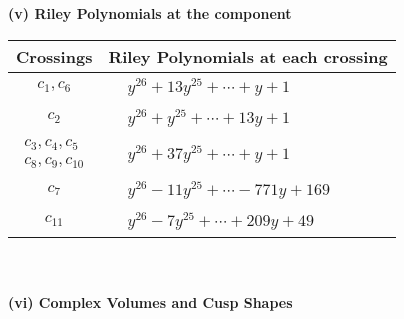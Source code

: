 \documentclass[1p]{elsarticle_modified}
\theoremstyle{definition}
\begin{document}
\newpage\renewcommand{\arraystretch}{1}
\flushleft \textbf{(v) Riley Polynomials at the component}\newline \\
\begin{tabular}{m{50pt}|m{274pt}}
Crossings & \hspace{64pt}Riley Polynomials at each crossing \\
\hline $$\begin{aligned}c_{1},c_{6}\end{aligned}$$&$\begin{aligned}
&y^{26}+13 y^{25}+\cdots+y+1
\end{aligned}$\\
\hline $$\begin{aligned}c_{2}\end{aligned}$$&$\begin{aligned}
&y^{26}+y^{25}+\cdots+13 y+1
\end{aligned}$\\
\hline $$\begin{aligned}c_{3},c_{4},c_{5}\\c_{8},c_{9},c_{10}\end{aligned}$$&$\begin{aligned}
&y^{26}+37 y^{25}+\cdots+y+1
\end{aligned}$\\
\hline $$\begin{aligned}c_{7}\end{aligned}$$&$\begin{aligned}
&y^{26}-11 y^{25}+\cdots-771 y+169
\end{aligned}$\\
\hline $$\begin{aligned}c_{11}\end{aligned}$$&$\begin{aligned}
&y^{26}-7 y^{25}+\cdots+209 y+49
\end{aligned}$\\
\hline
\end{tabular}\\~\\
\newpage\flushleft \textbf{(vi) Complex Volumes and Cusp Shapes}
\end{document}
